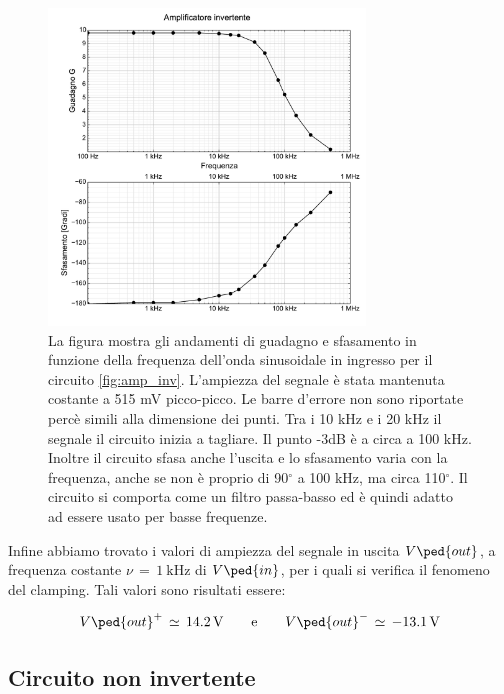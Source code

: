 \begin{figure}
    \includegraphics[width=0.75\textwidth]{amp_inv.pdf}
    \caption{La figura mostra gli andamenti di guadagno e sfasamento in funzione della
        frequenza dell'onda sinusoidale in ingresso per il circuito \ref{fig:amp_inv}. L'ampiezza del segnale è
        stata mantenuta costante a 515 mV picco-picco. Le barre d'errore non sono riportate percè simili alla dimensione
        dei punti. Tra i 10 kHz e i 20 kHz il segnale il circuito inizia a tagliare. Il punto -3dB è a circa a 100 kHz.
        Inoltre il circuito sfasa anche l'uscita e lo sfasamento varia con la frequenza, anche se non è proprio di 90$^\circ$
        a 100 kHz, ma circa 110$^\circ$. Il circuito si comporta come un filtro passa-basso ed è quindi adatto ad essere usato
        per basse frequenze.}
    \label{fig:g_vs_freq}
\end{figure}

Infine abbiamo trovato i valori di ampiezza del segnale in uscita $V\ped{out}$, a frequenza costante $\nu\,=\,\SI{1}{\kilo\hertz}$ di $V\ped{in}$, per i quali si verifica il fenomeno del clamping. Tali valori sono risultati essere:

\begin{equation}
        V\ped{out}^{+}\,\simeq\,\SI{14.2}{\volt} \qquad \text{e} \qquad V\ped{out}^{-}\,\simeq\,\SI{-13.1}{\volt}
        \label{eq:clamping_1}
\end{equation}

\subsection*{Circuito non invertente}

